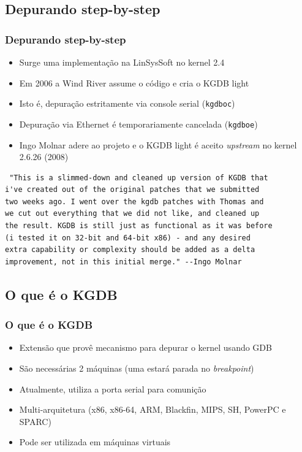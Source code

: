 \documentclass[xcolor=pdftex,dvipsnames,table]{beamer}
\begin{document}
\subsection{Depurando step-by-step}
\begin{frame}
	\frametitle{Depurando step-by-step}
	\begin{itemize}
		\item Surge uma implementação na LinSysSoft no kernel 2.4
		\item Em 2006 a Wind River assume o código e cria o KGDB light
		\item Isto é, depuração estritamente via console serial ({\tt kgdboc})
		\item Depuração via Ethernet é temporariamente cancelada ({\tt kgdboe})
		\item Ingo Molnar adere ao projeto e o KGDB light é aceito \textit{upstream} no kernel 2.6.26 (2008)
	\end{itemize}
\end{frame}

\begin{frame}[containsverbatim]
\small
\begin{center}
\begin{verbatim}
 "This is a slimmed-down and cleaned up version of KGDB that
i've created out of the original patches that we submitted
two weeks ago. I went over the kgdb patches with Thomas and
we cut out everything that we did not like, and cleaned up
the result. KGDB is still just as functional as it was before
(i tested it on 32-bit and 64-bit x86) - and any desired
extra capability or complexity should be added as a delta
improvement, not in this initial merge." --Ingo Molnar

\end{verbatim}
\end{center}
\end{frame}

\subsection{O que é o KGDB}
\begin{frame}
	\frametitle{O que é o KGDB}
	\begin{itemize}
		\item Extensão que provê mecanismo para depurar o kernel usando GDB
		\item São necessárias 2 máquinas (uma estará parada no \textit{breakpoint})
		\item Atualmente, utiliza a porta serial para comunição
		\item Multi-arquitetura (x86, x86-64, ARM, Blackfin, MIPS, SH, PowerPC e SPARC)
		\item Pode ser utilizada em máquinas virtuais
	\end{itemize}
\end{frame}
\end{document}
